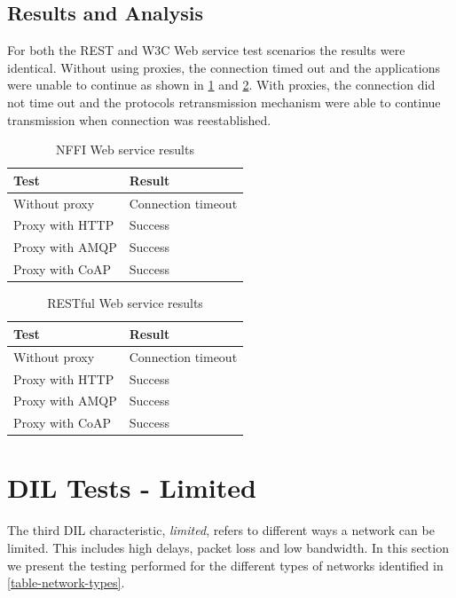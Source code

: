 \subsection{Results and Analysis}

For both the REST and W3C Web service test scenarios the results were identical.
Without using proxies, the connection timed out and the applications were unable
to continue as shown in \cref{table:disconnected-nffi} and
\cref{table:disconnected-rest}. With proxies, the connection did not time out
and the protocols retransmission mechanism were able to continue transmission
when connection was reestablished.


\begin{table}[h!]
\begin{tabular}{| l | l |}
\hline
  \textbf{Test} & \textbf{Result} \\ \hline
  Without proxy & Connection timeout \\ \hline
  Proxy with HTTP & Success \\ \hline
  Proxy with AMQP & Success \\ \hline
  Proxy with CoAP & Success \\ \hline
\end{tabular}
\caption{NFFI Web service results}
\label{table:disconnected-nffi}
\end{table}

\begin{table}[h!]
\begin{tabular}{| l | l |}
\hline
  \textbf{Test} & \textbf{Result} \\ \hline
  Without proxy & Connection timeout \\ \hline
  Proxy with HTTP & Success \\ \hline
  Proxy with AMQP & Success \\ \hline
  Proxy with CoAP & Success \\ \hline
\end{tabular}
\caption{RESTful Web service results}
\label{table:disconnected-rest}
\end{table}


\section{DIL Tests - Limited}

The third DIL characteristic, \textit{limited}, refers to different ways a
network can be limited. This includes high delays, packet loss and low
bandwidth. In this section we present the testing performed for the different
types of networks identified in \cref{table-network-types}.



